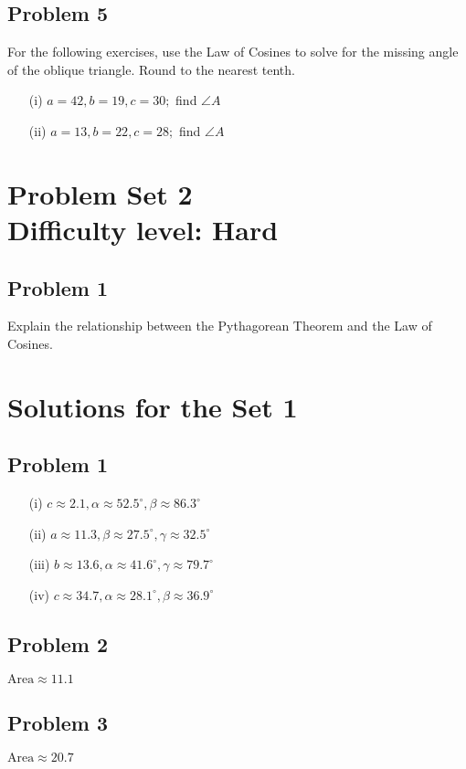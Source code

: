\documentclass[12pt]{article}
\begin{document}
\subsection*{Problem 5}
For the following exercises, use the Law of Cosines to solve for the missing angle of the oblique triangle. Round to the nearest tenth.

   \begin{itemize}
        \item[(i)] \(a=42,b=19,c=30;\) find \(\angle A\)
        \item[(ii)] \(a=13,b=22,c=28;\) find \(\angle A\)
    \end{itemize}

\section*{Problem Set 2\\Difficulty level: Hard}
\subsection*{Problem 1}
Explain the relationship between the Pythagorean Theorem and the Law of Cosines.

\newpage
\section*{Solutions for the Set 1}
\subsection*{Problem 1}
    \begin{itemize}
        \item[(i)] \(c \approx 2.1, \alpha \approx 52.5^{\circ}, \beta \approx 86.3^{\circ} \)
        \item[(ii)] \(a \approx 11.3, \beta \approx 27.5^{\circ}, \gamma \approx 32.5^{\circ} \)
        \item[(iii)] \(b \approx 13.6, \alpha \approx 41.6^{\circ}, \gamma \approx 79.7^{\circ} \)
        \item[(iv)] \(c \approx 34.7, \alpha \approx 28.1^{\circ}, \beta \approx 36.9^{\circ} \)
    \end{itemize}
\subsection*{Problem 2}
\(\text{Area} \approx 11.1\)
\subsection*{Problem 3}
\(\text{Area} \approx 20.7\)
\end{document}
